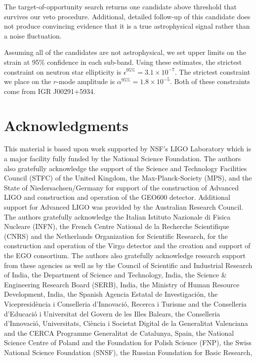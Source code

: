 The target-of-opportunity search returns one candidate above threshold that survives our veto procedure. Additional, detailed follow-up of this candidate does not produce convincing evidence that it is a true astrophysical signal rather than a noise fluctuation.

Assuming all of the candidates are not astrophysical, we set upper limits on the strain at 95\% confidence in each sub-band. Using these estimates, the strictest constraint on neutron star ellipticity is $\epsilon^{95\%} = 3.1\times 10^{-7}$. The strictest constraint we place on the $r$-mode amplitude is $\alpha^{95\%} = 1.8\times 10^{-5}$. Both of these constraints come from IGR J00291$+$5934.

\section*{Acknowledgments}
This material is based upon work supported by NSF’s LIGO Laboratory which is a major facility
fully funded by the National Science Foundation.
The authors also gratefully acknowledge the support of
the Science and Technology Facilities Council (STFC) of the
United Kingdom, the Max-Planck-Society (MPS), and the State of
Niedersachsen/Germany for support of the construction of Advanced LIGO 
and construction and operation of the GEO600 detector. 
Additional support for Advanced LIGO was provided by the Australian Research Council.
The authors gratefully acknowledge the Italian Istituto Nazionale di Fisica Nucleare (INFN),  
the French Centre National de la Recherche Scientifique (CNRS) and
the Netherlands Organization for Scientific Research, 
for the construction and operation of the Virgo detector
and the creation and support  of the EGO consortium. 
The authors also gratefully acknowledge research support from these agencies as well as by 
the Council of Scientific and Industrial Research of India, 
the Department of Science and Technology, India,
the Science \& Engineering Research Board (SERB), India,
the Ministry of Human Resource Development, India,
the Spanish Agencia Estatal de Investigaci\'on,
the Vicepresid\`encia i Conselleria d'Innovaci\'o, Recerca i Turisme and the Conselleria d'Educaci\'o i Universitat del Govern de les Illes Balears,
the Conselleria d'Innovaci\'o, Universitats, Ci\`encia i Societat Digital de la Generalitat Valenciana and
the CERCA Programme Generalitat de Catalunya, Spain,
the National Science Centre of Poland and the Foundation for Polish Science (FNP),
the Swiss National Science Foundation (SNSF),
the Russian Foundation for Basic Research, 
